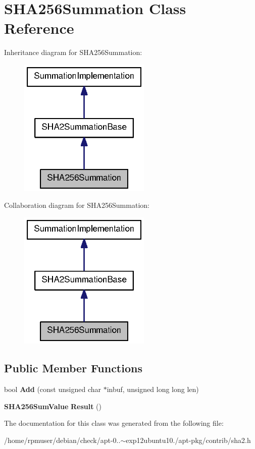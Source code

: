 \section{\-S\-H\-A256\-Summation \-Class \-Reference}
\label{classSHA256Summation}


\-Inheritance diagram for \-S\-H\-A256\-Summation\-:
\nopagebreak
\begin{figure}[H]
\begin{center}
\leavevmode
\includegraphics[width=178pt]{classSHA256Summation__inherit__graph}
\end{center}
\end{figure}


\-Collaboration diagram for \-S\-H\-A256\-Summation\-:
\nopagebreak
\begin{figure}[H]
\begin{center}
\leavevmode
\includegraphics[width=178pt]{classSHA256Summation__coll__graph}
\end{center}
\end{figure}
\subsection*{\-Public \-Member \-Functions}
\begin{DoxyCompactItemize}
\item 
bool {\bfseries \-Add} (const unsigned char $\ast$inbuf, unsigned long long len)\label{classSHA256Summation_aaf9245e21054d9eba3299d4cfd61e0e4}

\item 
{\bf \-S\-H\-A256\-Sum\-Value} {\bfseries \-Result} ()\label{classSHA256Summation_aba56b3ad026bcd63c44cbacfbe10051c}

\end{DoxyCompactItemize}


\-The documentation for this class was generated from the following file\-:\begin{DoxyCompactItemize}
\item 
/home/rpmuser/debian/check/apt-\/0..$\sim$exp12ubuntu10./apt-\/pkg/contrib/sha2.\-h\end{DoxyCompactItemize}
